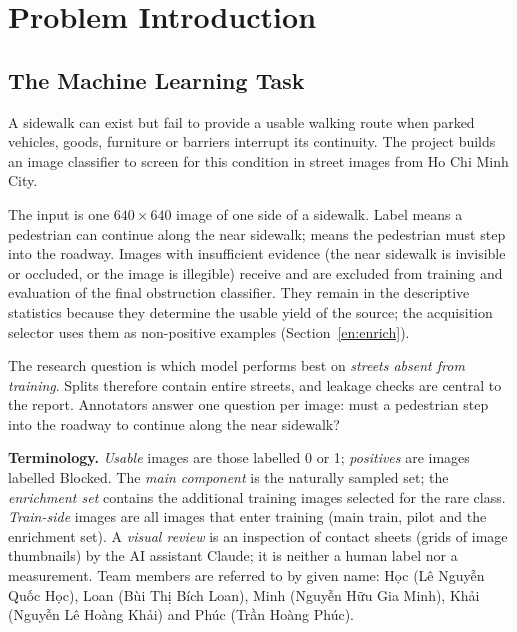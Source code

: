 \section{Problem Introduction}
\subsection{The Machine Learning Task}
A sidewalk can exist but fail to provide a usable walking route when parked vehicles, goods, furniture or barriers interrupt its continuity. The project builds an image classifier to screen for this condition in street images from Ho Chi Minh City.

The input is one $640\times640$ image of one side of a sidewalk. Label  means a pedestrian can continue along the near sidewalk;  means the pedestrian must step into the roadway. Images with insufficient evidence (the near sidewalk is invisible or occluded, or the image is illegible) receive  and are excluded from training and evaluation of the final obstruction classifier. They remain in the descriptive statistics because they determine the usable yield of the source; the acquisition selector uses them as non-positive examples (Section~\ref{en:enrich}).

The research question is which model performs best on \emph{streets absent from training}. Splits therefore contain entire streets, and leakage checks are central to the report. Annotators answer one question per image: must a pedestrian step into the roadway to continue along the near sidewalk?

\textbf{Terminology.} \emph{Usable} images are those labelled 0 or 1; \emph{positives} are images labelled Blocked. The \emph{main component} is the naturally sampled set; the \emph{enrichment set} contains the additional training images selected for the rare class. \emph{Train-side} images are all images that enter training (main train, pilot and the enrichment set). A \emph{visual review} is an inspection of contact sheets (grids of image thumbnails) by the AI assistant Claude; it is neither a human label nor a measurement. Team members are referred to by given name: Học (Lê Nguyễn Quốc Học), Loan (Bùi Thị Bích Loan), Minh (Nguyễn Hữu Gia Minh), Khải (Nguyễn Lê Hoàng Khải) and Phúc (Trần Hoàng Phúc).

